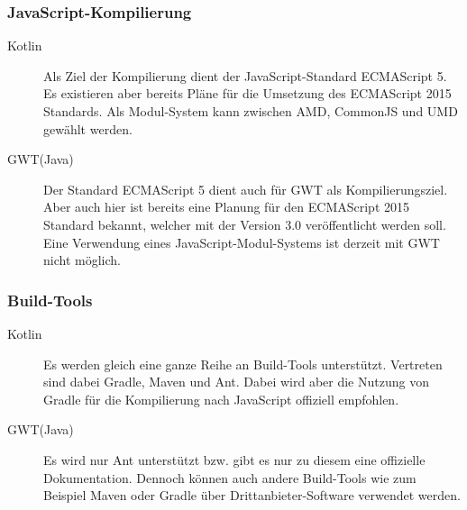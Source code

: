 \subsubsection{JavaScript-Kompilierung}
\begin{description}
	\item[Kotlin] Als Ziel der Kompilierung dient der JavaScript-Standard ECMAScript 5. Es existieren aber bereits Pläne für die Umsetzung des ECMAScript 2015 Standards. Als Modul-System kann zwischen \gls{AMD}, CommonJS und \gls{UMD} gewählt werden. \cite{kotlinJavaScript, kotlinJsModules} 
	\item[GWT(Java)] Der Standard ECMAScript 5 dient auch für \gls{GWT} als Kompilierungsziel. Aber auch hier ist bereits eine Planung für den ECMAScript 2015 Standard bekannt, welcher mit der Version 3.0 veröffentlicht werden soll. Eine Verwendung eines JavaScript-Modul-Systems ist derzeit mit \gls{GWT} nicht möglich. \cite{gwtRoadmap}
\end{description}

\subsubsection{Build-Tools}
\begin{description}
	\item[Kotlin] Es werden gleich eine ganze Reihe an Build-Tools unterstützt. Vertreten sind dabei Gradle, Maven und Ant. Dabei wird aber die Nutzung von Gradle für die Kompilierung nach JavaScript offiziell empfohlen. \cite{kotlinBuildTools, kotlinToJavaScript}
	\item[GWT(Java)] Es wird nur Ant unterstützt bzw. gibt es nur zu diesem eine offizielle Dokumentation. Dennoch können auch andere Build-Tools wie zum Beispiel Maven oder Gradle über Drittanbieter-Software verwendet werden. \cite{gwtGettingStarted}
\end{description}

